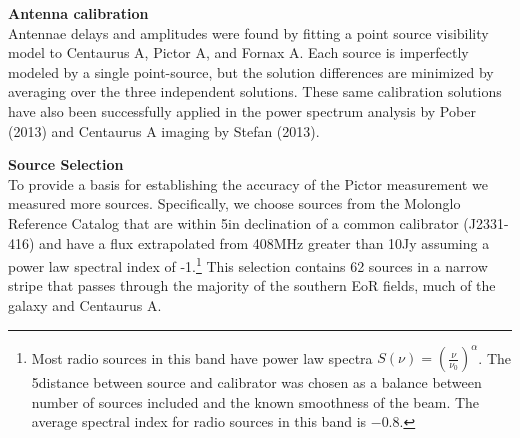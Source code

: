\documentclass[preprint]{aastex}
\begin{document}
\textbf{Antenna calibration}\\
Antennae delays and amplitudes were found by fitting a point source visibility model to Centaurus A, Pictor A, and Fornax A.  Each source is imperfectly modeled by a single point-source, but the solution differences are minimized by averaging over the three independent solutions. These same calibration solutions have also been successfully applied in the power spectrum analysis by Pober (2013) and Centaurus A imaging by Stefan (2013).  

\textbf{Source Selection}\\



To provide a basis for establishing the accuracy of the Pictor measurement we measured more sources.  Specifically, we choose sources from the Molonglo Reference Catalog \cite[MRC]{Large:1981p7798} that are within 5\arcdeg in declination of a common calibrator (J2331-416) and have a flux extrapolated from 408MHz greater than 10Jy assuming a power law spectral index of -1.\footnote{Most radio
  sources in this band have power law spectra $S(\nu) =
  \left(\frac{\nu}{\nu_0}\right)^\alpha$.  The 5\arcdeg distance between source and calibrator was chosen as a balance between number of sources included and the known smoothness of the beam.   The average spectral index
  for radio sources in this band is $-0.8$.} This selection contains 62 sources in a narrow stripe that passes through the majority of the southern EoR fields, much of the galaxy and Centaurus A.
\end{document}
